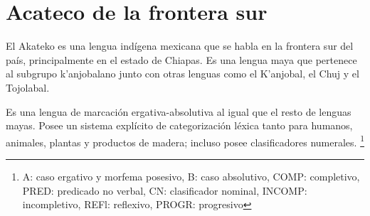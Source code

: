 \section*{Acateco de la frontera sur}

\noindent El Akateko es una lengua indígena mexicana que se habla en la frontera sur del país, principalmente en el estado de Chiapas. Es una lengua maya que pertenece al subgrupo k'anjobalano junto con otras lenguas como el K'anjobal, el Chuj y el Tojolabal.

Es una lengua de marcación ergativa-absolutiva al igual que el resto de lenguas mayas. Posee un sistema explícito de categorización léxica tanto para humanos, animales, plantas y productos de madera; incluso posee clasificadores numerales.%
\footnote{A: caso ergativo y morfema posesivo, B: caso absolutivo, COMP: completivo, PRED: predicado no verbal, CN: clasificador nominal, INCOMP: incompletivo, REFl: reflexivo, PROGR: progresivo} \vspace{0.3cm}

